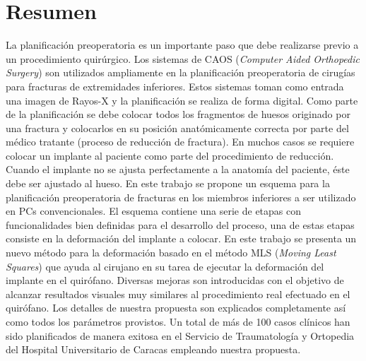

\chapter*{Resumen}

La planificaci\'on preoperatoria es un importante paso que debe realizarse previo a un procedimiento quir\'urgico. Los sistemas de CAOS (\textit{Computer Aided Orthopedic Surgery}) son utilizados ampliamente en la planificaci\'on preoperatoria de cirug\'ias para fracturas de extremidades inferiores. Estos sistemas toman como entrada una imagen de Rayos-X y la planificaci\'on se realiza de forma digital. Como parte de la planificaci\'on se debe colocar todos los fragmentos de huesos originado por una fractura y colocarlos en su posici\'on anat\'omicamente correcta por parte del m\'edico tratante (proceso de reducci\'on de fractura). En muchos casos se requiere colocar un implante al paciente como parte del procedimiento de reducci\'on. Cuando el implante no se ajusta perfectamente a la anatom\'ia del paciente, \'este debe ser ajustado al hueso. En este trabajo se propone un esquema para la planificaci\'on preoperatoria de fracturas en los miembros inferiores a ser utilizado en PCs convencionales. El esquema contiene una serie de etapas con funcionalidades bien definidas para el desarrollo del proceso, una de estas etapas consiste en la deformaci\'on del implante a colocar. En este trabajo se presenta un nuevo m\'etodo para la deformaci\'on basado en el m\'etodo MLS (\textit{Moving Least Squares}) que ayuda al cirujano en su tarea de ejecutar la deformaci\'on del implante en el quir\'ofano. Diversas mejoras son introducidas con el objetivo de alcanzar resultados visuales muy similares al procedimiento real efectuado en el quir\'ofano. Los detalles de nuestra propuesta son explicados completamente as\'i como todos los par\'ametros provistos. Un total de m\'as de 100 casos cl\'inicos han sido planificados de manera exitosa en el Servicio de Traumatolog\'ia y Ortopedia del Hospital Universitario de Caracas \cite{REF_HUC} empleando nuestra propuesta.
